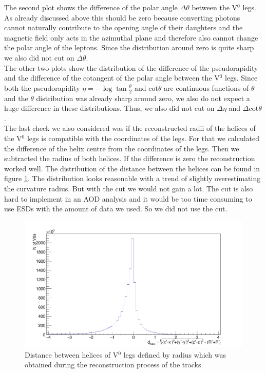 The second plot shows the difference of the polar angle $\Delta\theta$ between the V$^0$ legs. As already discussed above this should be zero because converting photons cannot naturally contribute to the opening angle of their daughters and the magnetic field only acts in the azimuthal plane and therefore also cannot change the polar angle of the leptons. Since the distribution around zero is quite sharp we also did not cut on $\Delta\theta$. \\
The other two plots show the distribution of the difference of the pseudorapidity and the difference of the cotangent of the polar angle between the V$^0$ legs. Since both the pseudorapidity $\eta = -\log\tan\frac{\theta}{2}$ and $\mathrm{cot}\theta$ are continuous functions of $\theta$ and the $\theta$ distribution was already sharp around zero, we also do not expect a huge difference in these distributions. Thus, we also did not cut on $\Delta\eta$ and $\Delta\mathrm{cot}\theta$. \\
The last check we also considered was if the reconstructed radii of the helices of the V$^0$ legs is compatible with the coordinates of the legs. For that we calculated the difference of the helix centre from the coordinates of the legs. Then we subtracted the radius of both helices. If the difference is zero the reconstruction worked well. The distribution of the distance between the helices can be found in figure \ref{fig:helixdist}. The distribution looks reasonable with a trend of slightly overestimating the curvature radius. But with the cut we would not gain a lot. The cut is also hard to implement in an AOD analysis and it would be too time consuming to use ESDs with the amount of data we used. So we did not use the cut. \\
\begin{figure}[b]
	\centering
	\includegraphics[width=0.8\linewidth]{Figures/additionalV0cuts/helixdist.png}
	\caption{Distance between helices of V$^0$ legs defined by radius which was obtained during the reconstruction process of the tracks}
	\label{fig:helixdist}
\end{figure}







